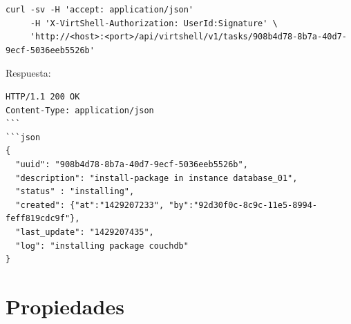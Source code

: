 \vspace{5mm}

\begin{lstlisting}[style=json, caption=Ejemplo de consulta de una tarea]
curl -sv -H 'accept: application/json' 
     -H 'X-VirtShell-Authorization: UserId:Signature' \ 
     'http://<host>:<port>/api/virtshell/v1/tasks/908b4d78-8b7a-40d7-9ecf-5036eeb5526b'
\end{lstlisting}

\vspace{5mm}

Respuesta:

\vspace{5mm}


\begin{lstlisting}[style=json, caption=Ejemplo del detalle de una tarea]
HTTP/1.1 200 OK
Content-Type: application/json
```
```json
{
  "uuid": "908b4d78-8b7a-40d7-9ecf-5036eeb5526b",
  "description": "install-package in instance database_01",
  "status" : "installing",
  "created": {"at":"1429207233", "by":"92d30f0c-8c9c-11e5-8994-feff819cdc9f"},
  "last_update": "1429207435",
  "log": "installing package couchdb"
}
\end{lstlisting}


\section{Propiedades}
